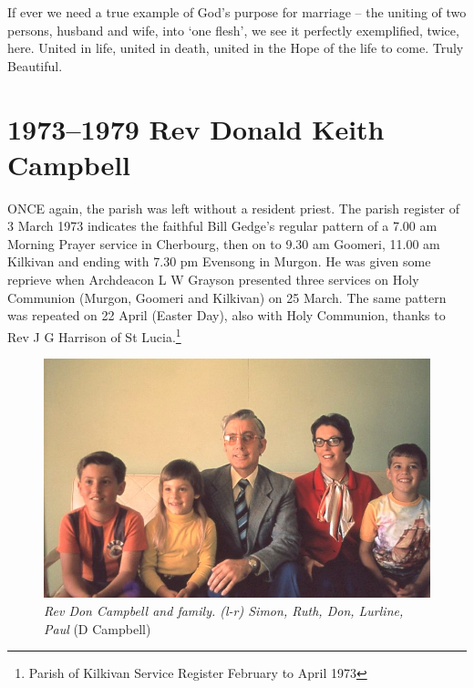 \balance


If ever we need a true example of God's purpose for marriage -- the uniting of two persons, husband and wife, into `one flesh', we see it perfectly exemplified, twice, here. United in life, united in death, united in the Hope of the life to come. Truly Beautiful.



\printendnotes[custom]
\setcounter{endnote}{0}




\chapter{1973--1979 Rev Donald Keith Campbell}
\nobalance


\lettrine[lines=3]{O}{NCE}
 again, the parish was left without a resident priest. The parish register of 3 March 1973 indicates the faithful Bill Gedge's regular pattern of a 7.00 am Morning Prayer service in Cherbourg, then on to 9.30 am Goomeri, 11.00 am Kilkivan and ending with 7.30 pm Evensong in Murgon. He was given some reprieve when Archdeacon L W Grayson presented three services on Holy Communion (Murgon, Goomeri and Kilkivan) on 25 March. The same pattern was repeated on 22 April (Easter Day), also with Holy Communion, thanks to Rev J G Harrison of St Lucia.\footnote{Parish of Kilkivan Service Register February to April 1973}







\begin{figure}
\begin{center}
\includegraphics[width=1.\linewidth,center]{../images/DonCampbellAndFamily.png}
\caption{{\itshape Rev Don Campbell and family. (l-r) Simon, Ruth, Don, Lurline, Paul} {\scriptsize(D Campbell)}}
\end{center}
\end{figure}




